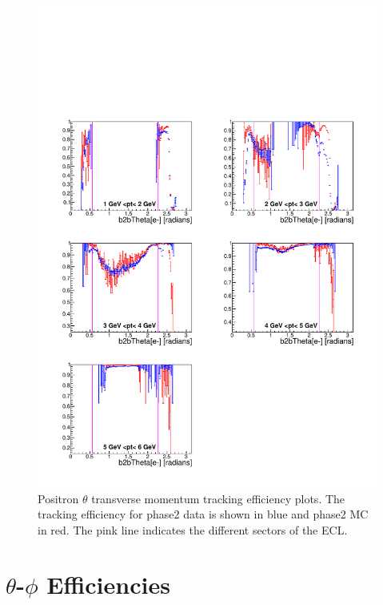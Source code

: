 \documentclass[a4paper,11pt,twosided,final,german,openbib,pdftex,listof=totoc,bibliography=totoc]{scrbook}
\begin{document}
\begin{figure}[!htbp]
	\centering
	\includegraphics[width=\textwidth]{Plots/master/xPtMThetaep}
	\caption[Transverse Momentum $\theta$ Positron Efficiency Phase2]{Positron $\theta$ transverse momentum tracking efficiency plots. The tracking efficiency for phase2 data is shown in blue and phase2 MC in red. The pink line indicates the different sectors of the ECL.}
	\label{plt:xPtMThetaep}
\end{figure}

\newpage

\section{$\theta$-$\phi$ Efficiencies}
\label{sec:tpEff}
\end{document}
